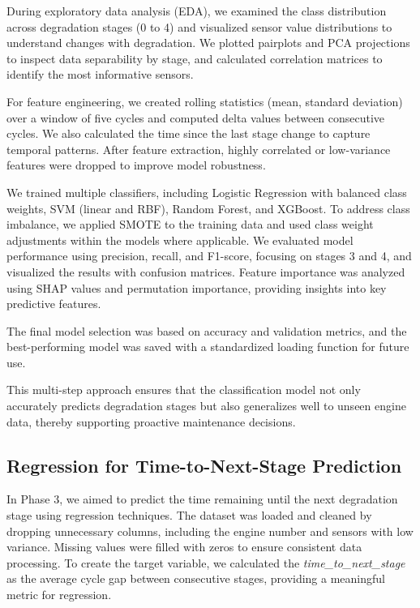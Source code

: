 \documentclass[conference]{IEEEtran}
\begin{document}
During exploratory data analysis (EDA), we examined the class distribution across degradation stages (0 to 4) and visualized sensor value distributions to understand changes with degradation. We plotted pairplots and PCA projections to inspect data separability by stage, and calculated correlation matrices to identify the most informative sensors.

For feature engineering, we created rolling statistics (mean, standard deviation) over a window of five cycles and computed delta values between consecutive cycles. We also calculated the time since the last stage change to capture temporal patterns. After feature extraction, highly correlated or low-variance features were dropped to improve model robustness.

We trained multiple classifiers, including Logistic Regression with balanced class weights, SVM (linear and RBF), Random Forest, and XGBoost. To address class imbalance, we applied SMOTE to the training data and used class weight adjustments within the models where applicable. We evaluated model performance using precision, recall, and F1-score, focusing on stages 3 and 4, and visualized the results with confusion matrices. Feature importance was analyzed using SHAP values and permutation importance, providing insights into key predictive features. 

The final model selection was based on accuracy and validation metrics, and the best-performing model was saved with a standardized loading function for future use. 

This multi-step approach ensures that the classification model not only accurately predicts degradation stages but also generalizes well to unseen engine data, thereby supporting proactive maintenance decisions.


\subsection{Regression for Time-to-Next-Stage Prediction}

In Phase 3, we aimed to predict the time remaining until the next degradation stage using regression techniques. The dataset was loaded and cleaned by dropping unnecessary columns, including the engine number and sensors with low variance. Missing values were filled with zeros to ensure consistent data processing. To create the target variable, we calculated the \textit{time\_to\_next\_stage} as the average cycle gap between consecutive stages, providing a meaningful metric for regression.
\end{document}
